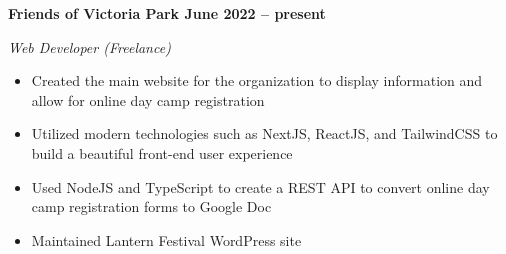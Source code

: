 \vspace{0.1cm}
\textbf{Friends of Victoria Park \hfill June 2022 -- present} \par
\textit{Web Developer (Freelance)} \par
\begin{itemize}
    \item Created the main website for the organization to display information and allow for online day camp registration
    \item Utilized modern technologies such as NextJS, ReactJS, and TailwindCSS to build a beautiful front-end user experience
    \item Used NodeJS and TypeScript to create a REST API to convert online day camp registration forms to Google Doc
    \item Maintained Lantern Festival WordPress site 
\end{itemize} \par